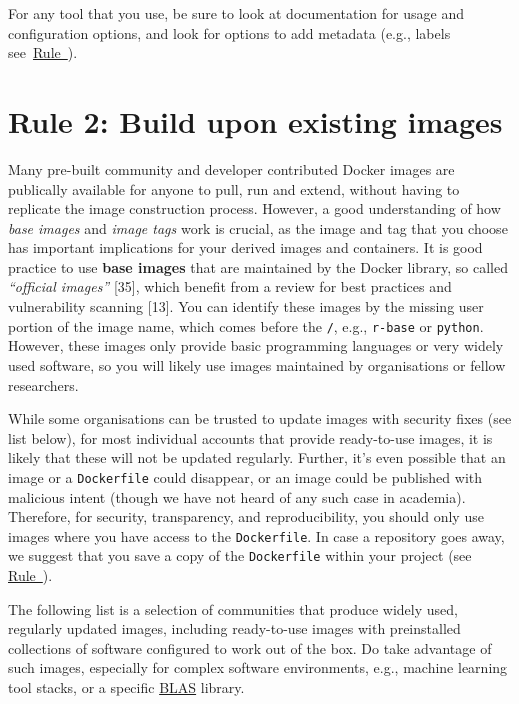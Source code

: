 \documentclass[10pt,letterpaper]{article}
\begin{document}
For any tool that you use, be sure to look at documentation for usage
and configuration options, and look for options to add metadata (e.g.,
labels see~\hyperref[{rule:document}]{Rule~}).

\hypertarget{rule-2-build-upon-existing-images}{%
\section*{Rule 2: Build upon existing
images}\label{rule-2-build-upon-existing-images}}

  \label{rule:base} 

Many pre-built community and developer contributed Docker images are
publically available for anyone to pull, run and extend, without having
to replicate the image construction process. However, a good
understanding of how \emph{base images} and \emph{image tags} work is
crucial, as the image and tag that you choose has important implications
for your derived images and containers. It is good practice to use
\textbf{base images} that are maintained by the Docker library, so
called \emph{``official images''} {[}35{]}, which benefit from a review
for best practices and vulnerability scanning {[}13{]}. You can identify
these images by the missing user portion of the image name, which comes
before the \texttt{/}, e.g., \texttt{r-base} or \texttt{python}.
However, these images only provide basic programming languages or very
widely used software, so you will likely use images maintained by
organisations or fellow researchers.

While some organisations can be trusted to update images with security
fixes (see list below), for most individual accounts that provide
ready-to-use images, it is likely that these will not be updated
regularly. Further, it's even possible that an image or a
\texttt{Dockerfile} could disappear, or an image could be published with
malicious intent (though we have not heard of any such case in
academia). Therefore, for security, transparency, and reproducibility,
you should only use images where you have access to the
\texttt{Dockerfile}. In case a repository goes away, we suggest that you
save a copy of the \texttt{Dockerfile} within your project (see
\hyperref[{rule:mount}]{Rule~}).

The following list is a selection of communities that produce widely
used, regularly updated images, including ready-to-use images with
preinstalled collections of software configured to work out of the box.
Do take advantage of such images, especially for complex software
environments, e.g., machine learning tool stacks, or a specific
\href{https://en.wikipedia.org/wiki/Basic_Linear_Algebra_Subprograms}{BLAS}
library.
\end{document}
